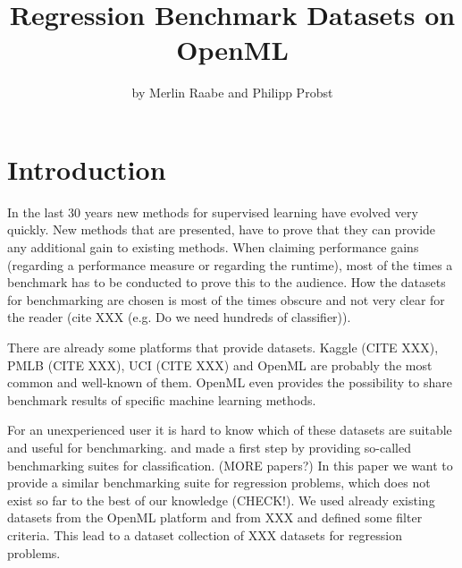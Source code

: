 \documentclass[a4paper]{article}
\begin{document}
\title{Regression Benchmark Datasets on OpenML}

\author{by Merlin Raabe and Philipp Probst}

\maketitle
{}

\section{Introduction}
In the last 30 years new methods for supervised learning have evolved very quickly. 
New methods that are presented, have to prove that they can provide any additional gain to existing methods.
When claiming performance gains (regarding a performance measure or regarding the runtime), most of the times a benchmark has to be conducted to prove this to the audience. 
How the datasets for benchmarking are chosen is most of the times obscure and not very clear for the reader (cite XXX (e.g. Do we need hundreds of classifier)). 

There are already some platforms that provide datasets. 
Kaggle (CITE XXX), PMLB (CITE XXX), UCI (CITE XXX) and OpenML \citep{OpenML2013} are probably the most common and well-known of them. 
OpenML even provides the possibility to share benchmark results of specific machine learning methods. 

For an unexperienced user it is hard to know which of these datasets are suitable and useful for benchmarking. 
\citet{Bischl2017} and \citet{Olson2017} made a first step by providing so-called benchmarking suites for classification. 
(MORE papers?)
In this paper we want to provide a similar benchmarking suite for regression problems, which does not exist so far to the best of our knowledge (CHECK!). We used already existing datasets from the OpenML platform and from XXX and defined some filter criteria. 
This lead to a dataset collection of XXX datasets for regression problems.
\end{document}
